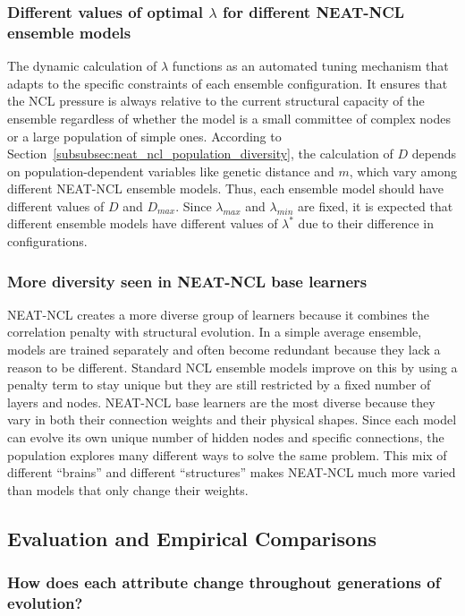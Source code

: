 \documentclass{article}
\begin{document}
\subsubsection{Different values of optimal $\lambda$ for different NEAT-NCL ensemble models}
The dynamic calculation of $\lambda$ functions as an automated tuning mechanism that adapts to the specific constraints of each ensemble configuration. It ensures that the NCL pressure is always relative to the current structural capacity of the ensemble regardless of whether the model is a small committee of complex nodes or a large population of simple ones. According to Section~\ref{subsubsec:neat_ncl_population_diversity}, the calculation of $D$ depends on population-dependent variables like genetic distance and $m$, which vary among different NEAT-NCL ensemble models. Thus, each ensemble model should have different values of $D$ and $D_{max}$. Since $\lambda_{max}$ and $\lambda_{min}$ are fixed, it is expected that different ensemble models have different values of $\lambda^*$ due to their difference in configurations. 


\subsubsection{More diversity seen in NEAT-NCL base learners}
NEAT-NCL creates a more diverse group of learners because it combines the correlation penalty with structural evolution. In a simple average ensemble, models are trained separately and often become redundant because they lack a reason to be different. Standard NCL ensemble models improve on this by using a penalty term to stay unique but they are still restricted by a fixed number of layers and nodes. NEAT-NCL base learners are the most diverse because they vary in both their connection weights and their physical shapes. Since each model can evolve its own unique number of hidden nodes and specific connections, the population explores many different ways to solve the same problem. This mix of different ``brains'' and different ``structures'' makes NEAT-NCL much more varied than models that only change their weights. 


\subsection{Evaluation and Empirical Comparisons}


\subsubsection{How does each attribute change throughout generations of evolution? }
\end{document}

